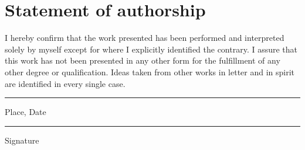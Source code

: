 \documentclass[a4paper, 12pt, bibliography=totoc]{scrartcl}
\begin{document}
\thispagestyle{empty}
\section*{Statement of authorship}

I hereby confirm that the work presented has been performed and interpreted solely by myself
except for where I explicitly identified the contrary.
I assure that this work has not been presented in any other form for the fulfillment of any other degree or qualification.
Ideas taken from other works in letter and in spirit are identified in every single case.

\vspace{3cm}

\begin{center}
	\parbox{6cm}{\hrule \strut \centering Place, Date} \hspace{1.5cm} \parbox{6cm}{\hrule \strut \centering Signature}	 	
\end{center}
\end{document}
